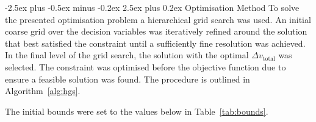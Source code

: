 \documentclass[10pt,twocolumn]{revtex4-2}    %
\makeatletter
\renewcommand{\subsection}{\@startsection{subsection}{2}{\z@}%
  {-2.5ex plus -0.5ex minus -0.2ex}%
  {2.5ex plus 0.2ex}%
  {\normalfont\normalsize\bfseries}}
\makeatother
\begin{document}
\subsection{Optimisation Method}
\label{sec:optimisation}
To solve the presented optimisation problem a hierarchical grid search was used. An initial coarse grid over the decision variables was iteratively refined around the solution that best satisfied the constraint until a sufficiently fine resolution was achieved. In the final level of the grid search, the solution with the optimal $\Delta v_{\mathrm{total}}$ was selected. The constraint was optimised before the objective function due to ensure a feasible solution was found. The procedure is outlined in Algorithm~\ref{alg:hgs}.

\begin{algorithm}[H]
\SetAlFnt{\small}
\SetAlCapFnt{\small}
\SetAlCapNameFnt{\small}
\caption{Hierarchical grid search}\label{alg:hgs}


\BlankLine

\end{algorithm}

\vspace{1em}

The initial bounds were set to the values below in Table~\ref{tab:bounds}. 
\vspace{1em}
\end{document}
